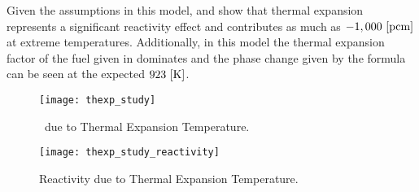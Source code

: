   Given the assumptions in this model,  and
   show that thermal expansion represents a
  significant reactivity effect and contributes as much as $-1,000 \,\left[\text{{pcm}}\right]$
  at extreme temperatures. Additionally, in this model the thermal expansion
  factor of the fuel given in  dominates and the phase change 
  given by the formula can be seen at the expected $923 \,\left[\text{{K}}\right]$.

  \begin{figure}
    \centering
    \texttt{[image: thexp\_study]}
    \caption{\keff \, due to Thermal Expansion Temperature.}
    \label{fig:thexp_study}
  \end{figure}

  \begin{figure}
    \centering
    \texttt{[image: thexp\_study\_reactivity]}
    \caption{Reactivity due to Thermal Expansion Temperature.}
    \label{fig:thexp_study_reactivity}
  \end{figure}


